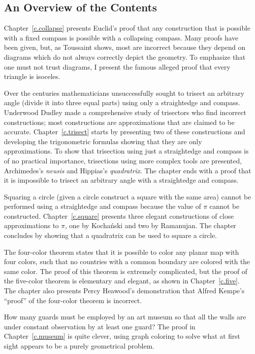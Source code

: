 \subsection*{An Overview of the Contents}

Chapter~\ref{c.collapse} presents Euclid's proof that any construction that is possible with a fixed compass is possible with a collapsing compass. Many proofs have been given, but, as Toussaint shows, most are incorrect because they depend on diagrams which do not always correctly depict the geometry. To emphasize that one must not trust diagrams, I present the famous alleged proof that every triangle is isoceles. 

Over the centuries mathematicians unsuccessfully sought to trisect an arbitrary angle (divide it into three equal parts) using only a straightedge and compass. Underwood Dudley made a comprehensive study of trisectors who find incorrect constructions; most constructions are approximations that are claimed to be accurate. Chapter~\ref{c.trisect} starts by presenting two of these constructions and developing the trigonometric formulas showing that they are only approximations. To show that trisection using just a straightedge and compass is of no practical importance, trisections using more complex tools are presented, Archimedes's \emph{neusis} and Hippias's \emph{quadratrix}. The chapter ends with a proof that it is impossible to trisect an arbitrary angle with a straightedge and compass. 

Squaring a circle (given a circle construct a square with the same area) cannot be performed using a straightedge and compass because the value of $\pi$ cannot be constructed. Chapter~\ref{c.square} presents three elegant constructions of close approximations to $\pi$, one by Kocha\'{n}ski and two by Ramanujan. The chapter concludes by showing that a quadratrix can be used to square a circle.

The four-color theorem states that it is possible to color any planar map with four colors, such that no countries with a common boundary are colored with the same color. The proof of this theorem is extremely complicated, but the proof of the five-color theorem is elementary and elegant, as shown in Chapter~\ref{c.five}. The chapter also presents Percy Heawood's demonstration that Alfred Kempe's ``proof'' of the four-color theorem is incorrect.

How many guards must be employed by an art museum so that all the walls are under constant observation by at least one guard? The proof in Chapter~\ref{c.museum} is quite clever, using graph coloring to solve what at first sight appears to be a purely geometrical problem.

